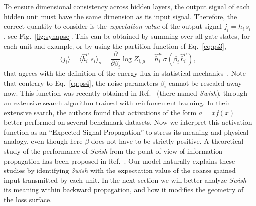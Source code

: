 \documentclass[5p]{elsarticle}
\begin{document}
 To ensure dimensional consistency across hidden layers, the output signal of each hidden unit must have the same dimension as its input signal. Therefore, the correct quantity to consider is the {\it expectation value} of the output signal $j_i = h_i \, s_i $, see  Fig.~\eqref{fig:synapse}.  This can be  obtained by summing over all gate states, for each unit and example, or by using the partition function of Eq.~\eqref{eq:ps3},
%
\begin{equation} \label{eq:ps5}
\langle j_i \rangle = \langle \hat{h}_i^{\mu} \, s_i \rangle_s = \frac{\partial}{\partial \beta_i} \log{Z_{i,\mu}} = \hat{h}^{\mu}_i \, \sigma(\beta_i \, \hat{h}^{\mu}_i),
\end{equation}
%
that agrees with the definition of the energy flux in statistical mechanics~\cite{bellac}. Note that contrary to Eq.~\eqref{eq:ps4}, the noise parameters $\beta_i$ cannot be rescaled away now.  This function was recently obtained in Ref.~\cite{prajit} (there named {\it Swish}), through an extensive search algorithm trained with reinforcement learning. In their extensive search, the authors found that activations of the form $a = x f(x)$  better performed on several benchmark datasets.
Now we interpret this activation function as an ``Expected Signal Propagation'' to stress its meaning and physical analogy, even though here $\beta$ does not have to be strictly positive.
        A theoretical study of the performance of {\it Swish} from the point of view of information propagation has been proposed in Ref.~\cite{soufiane}.  Our model naturally explains these studies by identifying {\it Swish} with the expectation value of the coarse grained input transmitted by each unit. In the next section we will better analyze {\it Swish} its meaning within backward propagation, and how it modifies the geometry of the loss surface.
\end{document}
